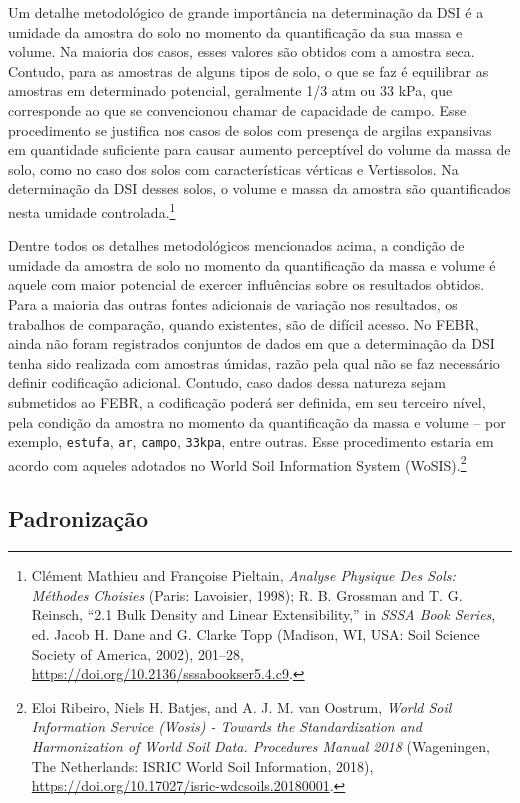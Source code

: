 \documentclass[a4paper,dvipsnames]{tufte-book}
\begin{document}
Um detalhe metodológico de grande importância na determinação da DSI é a
umidade da amostra do solo no momento da quantificação da sua massa e
volume. Na maioria dos casos, esses valores são obtidos com a amostra
seca. Contudo, para as amostras de alguns tipos de solo, o que se faz é
equilibrar as amostras em determinado potencial, geralmente 1/3 atm ou
33 kPa, que corresponde ao que se convencionou chamar de capacidade de
campo. Esse procedimento se justifica nos casos de solos com presença de
argilas expansivas em quantidade suficiente para causar aumento
perceptível do volume da massa de solo, como no caso dos solos com
características vérticas e Vertissolos. Na determinação da DSI desses
solos, o volume e massa da amostra são quantificados nesta umidade
controlada.\footnote{Clément Mathieu and Françoise Pieltain,
  \emph{Analyse Physique Des Sols: Méthodes Choisies} (Paris: Lavoisier,
  1998); R. B. Grossman and T. G. Reinsch, ``2.1 Bulk Density and Linear
  Extensibility,'' in \emph{SSSA Book Series}, ed. Jacob H. Dane and G.
  Clarke Topp (Madison, WI, USA: Soil Science Society of America, 2002),
  201--28, \url{https://doi.org/10.2136/sssabookser5.4.c9}.}

Dentre todos os detalhes metodológicos mencionados acima, a condição de
umidade da amostra de solo no momento da quantificação da massa e volume
é aquele com maior potencial de exercer influências sobre os resultados
obtidos. Para a maioria das outras fontes adicionais de variação nos
resultados, os trabalhos de comparação, quando existentes, são de
difícil acesso. No FEBR, ainda não foram registrados conjuntos de dados
em que a determinação da DSI tenha sido realizada com amostras úmidas,
razão pela qual não se faz necessário definir codificação adicional.
Contudo, caso dados dessa natureza sejam submetidos ao FEBR, a
codificação poderá ser definida, em seu terceiro nível, pela condição da
amostra no momento da quantificação da massa e volume -- por exemplo,
\texttt{estufa}, \texttt{ar}, \texttt{campo}, \texttt{33kpa}, entre
outras. Esse procedimento estaria em acordo com aqueles adotados no
World Soil Information System (WoSIS).\footnote{Eloi Ribeiro, Niels H.
  Batjes, and A. J. M. van Oostrum, \emph{World Soil Information Service
  (Wosis) - Towards the Standardization and Harmonization of World Soil
  Data. Procedures Manual 2018} (Wageningen, The Netherlands: ISRIC
  World Soil Information, 2018),
  \url{https://doi.org/10.17027/isric-wdcsoils.20180001}.}

\subsection{Padronização}\label{padronizauxe7uxe3o-1}
\end{document}
